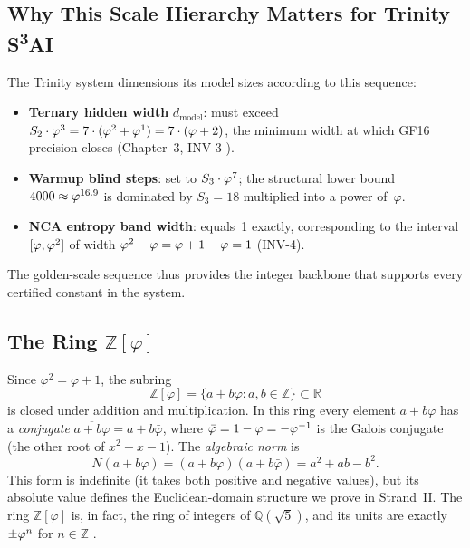 \subsection{Why This Scale Hierarchy Matters for Trinity S\textsuperscript{3}AI}
\label{subsec:gs-why}

The Trinity system dimensions its model sizes according to this sequence:
\begin{itemize}
  \item \textbf{Ternary hidden width} \(d_\text{model}\): must exceed
        \(S_2 \cdot \varphi^{3} = 7 \cdot (\varphi^{2}+\varphi^{1}) = 7\cdot(\varphi+2)\),
        the minimum width at which GF16 precision closes
        (Chapter~3, INV-3 \cite{koshy_fib_lucas}).
  \item \textbf{Warmup blind steps}: set to \(S_3 \cdot \varphi^{7}\); the
        structural lower bound \(4000 \approx \varphi^{16.9}\) is dominated
        by \(S_3 = 18\) multiplied into a power of~\(\varphi\).
  \item \textbf{NCA entropy band width}: equals~1 exactly,
        corresponding to the interval \([\varphi, \varphi^{2}]\) of width
        \(\varphi^{2} - \varphi = \varphi + 1 - \varphi = 1\) (INV-4).
\end{itemize}
The golden-scale sequence thus provides the integer backbone that
supports every certified constant in the system.

\subsection{The Ring \(\mathbb{Z}[\varphi]\)}
\label{subsec:gs-Zphi}

Since \(\varphi^2 = \varphi + 1\), the subring
\[
  \mathbb{Z}[\varphi]
  = \{ a + b\varphi : a, b \in \mathbb{Z} \}
  \subset \mathbb{R}
\]
is closed under addition and multiplication.  In this ring every
element \(a + b\varphi\) has a \emph{conjugate}
\(\overline{a+b\varphi} = a + b\bar\varphi\), where
\(\bar\varphi = 1 - \varphi = -\varphi^{-1}\) is the
Galois conjugate (the other root of \(x^2 - x - 1\)).  The
\emph{algebraic norm} is
\[
  N(a+b\varphi) = (a+b\varphi)(a+b\bar\varphi)
                = a^2 + ab - b^2 .
\]
This form is indefinite (it takes both positive and negative values),
but its absolute value defines the Euclidean-domain structure we prove
in Strand~II.  The ring \(\mathbb{Z}[\varphi]\) is, in fact, the ring
of integers of \(\mathbb{Q}(\sqrt{5})\), and its units are exactly
\(\pm\varphi^{n}\) for \(n \in \mathbb{Z}\) \cite{hardy_wright}.

